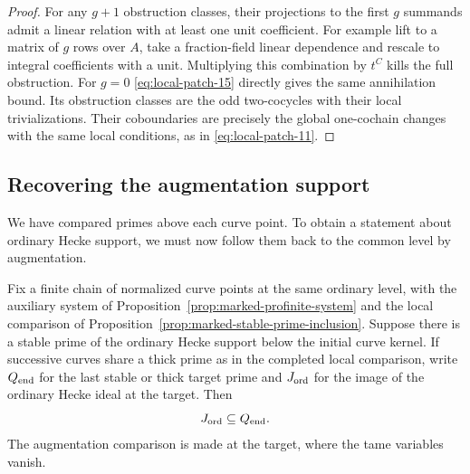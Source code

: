 \begin{proof}
For any \(g+1\) obstruction
classes, their projections to the first \(g\)
summands admit a linear relation with at least
one unit coefficient. For example lift to a
matrix of \(g\) rows over \(A\), take a
fraction-field linear dependence and rescale to
integral coefficients with a unit. Multiplying
this combination by \(t^C\) kills the full
obstruction. For \(g=0\) \eqref{eq:local-patch-15} directly gives the
same annihilation bound.  Its obstruction classes
are the odd two-cocycles with their local
trivializations. Their coboundaries are precisely
the global one-cochain changes with the same
local conditions, as in \eqref{eq:local-patch-11}.

\end{proof}






\subsection{Recovering the augmentation support}
\label{subsec:marked-augmentation}

We have compared primes above each curve point. To obtain a statement about ordinary
Hecke support, we must now follow them back to the common level by augmentation.

\begin{proposition}\label{prop:marked-chain-support}
Fix a finite chain of normalized curve points at the same
ordinary level, with the auxiliary system of
Proposition~\ref{prop:marked-profinite-system} and the local
comparison of Proposition~\ref{prop:marked-stable-prime-inclusion}. Suppose there is a stable prime of the
ordinary Hecke support below the initial curve kernel.
If successive curves share a thick prime as in the
completed local comparison, write \(Q_{\rm end}\) for the last stable or thick target prime
and \(J_{\rm ord}\) for the image of the ordinary Hecke ideal at the target. Then
\[
                      J_{\rm ord}\subseteq Q_{\rm end}.
\] The augmentation comparison is made at the
target, where the tame variables vanish.
\end{proposition}

